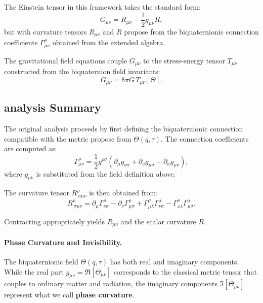 The Einstein tensor in this framework takes the standard form:
\begin{equation}
  G_{\mu\nu} = R_{\mu\nu} - \frac{1}{2} g_{\mu\nu} R ,
\end{equation}
but with curvature tensors $R_{\mu\nu}$ and $R$ propose from the biquaternionic connection
coefficients $\Gamma^\rho_{\mu\nu}$ obtained from the extended algebra.

The gravitational field equations couple $G_{\mu\nu}$ to the stress-energy tensor
$T_{\mu\nu}$ constructed from the biquaternion field invariants:
\begin{equation}
  G_{\mu\nu} = 8\pi G \, T_{\mu\nu}[\Theta] .
\end{equation}

\subsection{analysis Summary}

The original analysis proceeds by first defining the biquaternionic connection
compatible with the metric propose from $\Theta(q,\tau)$. The connection coefficients
are computed as:
\begin{equation}
  \Gamma^\rho_{\mu\nu} =
  \frac{1}{2} g^{\rho\sigma} \left( \partial_\mu g_{\nu\sigma}
  + \partial_\nu g_{\mu\sigma}
  - \partial_\sigma g_{\mu\nu} \right),
\end{equation}
where $g_{\mu\nu}$ is substituted from the field definition above.

The curvature tensor $R^\rho_{\ \sigma\mu\nu}$ is then obtained from:
\begin{equation}
  R^\rho_{\ \sigma\mu\nu} =
  \partial_\mu \Gamma^\rho_{\nu\sigma} -
  \partial_\nu \Gamma^\rho_{\mu\sigma} +
  \Gamma^\rho_{\mu\lambda} \Gamma^\lambda_{\nu\sigma} -
  \Gamma^\rho_{\nu\lambda} \Gamma^\lambda_{\mu\sigma} .
\end{equation}

Contracting appropriately yields $R_{\mu\nu}$ and the scalar curvature $R$.

\paragraph{Phase Curvature and Invisibility.}
The biquaternionic field $\Theta(q,\tau)$ has both real and imaginary components. While the 
real part $g_{\mu\nu} = \Re[\Theta_{\mu\nu}]$ corresponds to the classical metric tensor that 
couples to ordinary matter and radiation, the imaginary components $\Im[\Theta_{\mu\nu}]$ represent 
what we call \textbf{phase curvature}.

